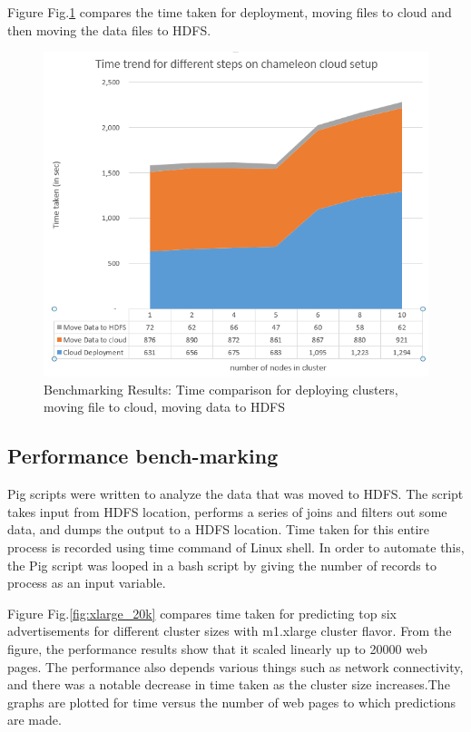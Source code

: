 \documentclass[9pt,twocolumn,twoside]{../../styles/osajnl}
\begin{document}
Figure Fig.\ref{fig:deployment_timetrend} compares the time taken for deployment, moving files to cloud and then moving the data files to HDFS.

\begin{figure}[hptb]
\centering
\includegraphics[width=\linewidth]{images/deployment_timetrend.PNG}
\caption{ Benchmarking Results: Time comparison for deploying clusters, moving file to cloud, moving data to HDFS}
\label{fig:deployment_timetrend}
\end{figure}

\subsection{Performance bench-marking}
Pig scripts were written to analyze the data that was moved to HDFS. The script takes input from HDFS location, performs a series of joins and filters out some data, and dumps the output to a HDFS location. Time taken for this entire process is recorded using time command of Linux shell. In order to automate this, the Pig script was looped in a bash script by giving the number of records to process as an input variable. 

Figure Fig.\ref{fig:xlarge_20k} compares time taken for predicting top six advertisements for different cluster sizes with m1.xlarge cluster flavor. From the figure, the performance results show that it scaled linearly up to 20000 web pages. The performance also depends various things such as network connectivity, and there was a notable decrease in time taken as the cluster size increases.The graphs are plotted for time versus the number of web pages to which predictions are made.
\end{document}
